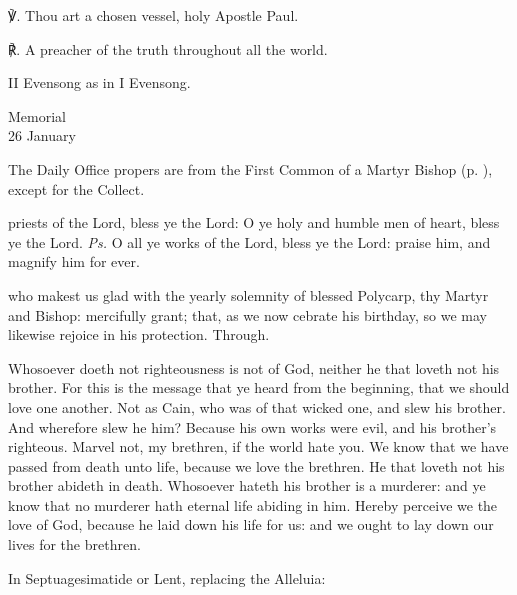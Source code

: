 ℣. Thou art a chosen vessel, holy Apostle Paul.

℟. A preacher of the truth throughout all the world.

\begin{rubric}
	II Evensong as in I Evensong.
\end{rubric}


\begin{inhead}
    {Memorial\\
26 January}
\end{inhead}

\begin{rubric}
	The Daily Office propers are from the First Common of a Martyr Bishop (p. \pageref{CommonMartyrBishopI}), except for the Collect.
\end{rubric}

\introit
{} priests of the Lord, bless ye the Lord: O ye holy and humble men of heart, bless ye the Lord. \textit{Ps.} O all ye works of the Lord, bless ye the Lord: praise him, and magnify him for ever.

\collect
{} who makest us glad with the yearly solemnity of blessed Polycarp, thy Martyr and Bishop: mercifully grant; that, as we now cebrate his birthday, so we may likewise rejoice in his protection. Through.

 Whosoever doeth not righteousness is not of God, neither he that loveth not his brother. For this is the message that ye heard from the beginning, that we should love one another. Not as Cain, who was of that wicked one, and slew his brother. And wherefore slew he him? Because his own works were evil, and his brother's righteous. Marvel not, my brethren, if the world hate you. We know that we have passed from death unto life, because we love the brethren. He that loveth not his brother abideth in death. Whosoever hateth his brother is a murderer: and ye know that no murderer hath eternal life abiding in him. Hereby perceive we the love of God, because he laid down his life for us: and we ought to lay down our lives for the brethren.


\begin{rubric}
{In Septuagesimatide or Lent, replacing the Alleluia:}
\end{rubric}\par\noindent
{}

